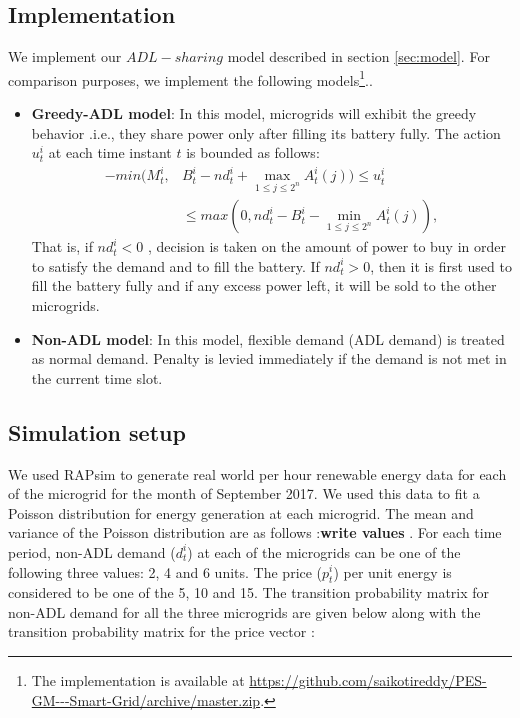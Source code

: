 \subsection{Implementation}
We implement our $ADL-sharing$ model described in section \ref{sec:model}. For comparison purposes, we implement the following models\footnote{The implementation is available at \url{https://github.com/saikotireddy/PES-GM---Smart-Grid/archive/master.zip}.}.. 
\begin{itemize}
	\item \textbf{Greedy-ADL model}: In this model,  microgrids will exhibit the greedy behavior .i.e., they share power only after filling its battery fully. The action $u_t^i$ at each time instant $t$ is bounded as follows:  
	\begin{align}
	-min(M_t^i, & B_t^i - nd_t^i + \max_{1\leq j \leq 2^n} A_t^i(j) ) \leq u_t^i \nonumber\\ &\leq max(0, nd_t^i - B_t^i - \min_{1\leq j \leq 2^n} A_t^i(j)),
	\end{align}
	That is, if $ nd_t^i < 0$ , decision is taken on the amount of power to buy in order to satisfy the demand and to fill the battery. If $ nd_t^i > 0$, then it is first used to fill the battery fully and if any excess power left, it will be sold to the other microgrids.
	
	\item \textbf{Non-ADL model}:  In this model, flexible demand (ADL demand) is treated as normal demand. Penalty is levied immediately if the demand is not met in the current time slot.
\end{itemize}
\subsection{Simulation setup}
We used RAPsim to generate real world per hour renewable energy data for each of the microgrid  for the month of September 2017. We used this data to fit a Poisson distribution for energy generation at each microgrid. The mean and variance of the Poisson distribution are as follows :\textbf{write values} .
For each time period, non-ADL demand ($d_t^i$) at each of the microgrids can be one of the following  three values: 2, 4 and 6 units. The price ($p_t^i$) per unit energy  is considered to be one of the 5, 10 and 15. 
The  transition probability matrix for non-ADL demand for all the three microgrids are given below along with the transition probability matrix for the price vector :

